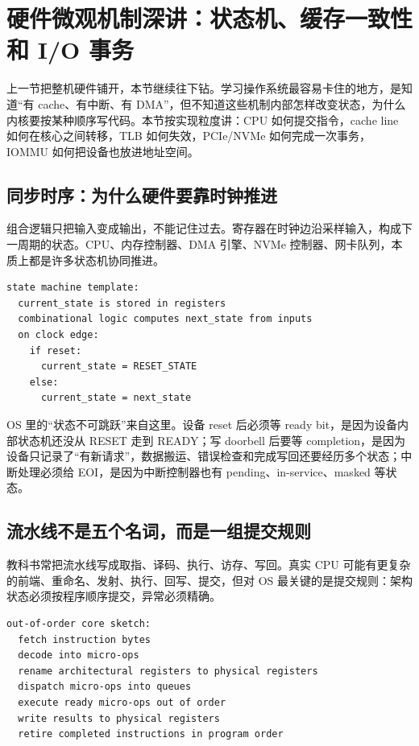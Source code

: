 \section{硬件微观机制深讲：状态机、缓存一致性和 I/O 事务}

上一节把整机硬件铺开，本节继续往下钻。学习操作系统最容易卡住的地方，是知道“有 cache、有中断、有 DMA”，但不知道这些机制内部怎样改变状态，为什么内核要按某种顺序写代码。本节按实现粒度讲：CPU 如何提交指令，cache line 如何在核心之间转移，TLB 如何失效，PCIe/NVMe 如何完成一次事务，IOMMU 如何把设备也放进地址空间。

\subsection{同步时序：为什么硬件要靠时钟推进}

组合逻辑只把输入变成输出，不能记住过去。寄存器在时钟边沿采样输入，构成下一周期的状态。CPU、内存控制器、DMA 引擎、NVMe 控制器、网卡队列，本质上都是许多状态机协同推进。

\begin{lstlisting}
state machine template:
  current_state is stored in registers
  combinational logic computes next_state from inputs
  on clock edge:
    if reset:
      current_state = RESET_STATE
    else:
      current_state = next_state
\end{lstlisting}

OS 里的“状态不可跳跃”来自这里。设备 reset 后必须等 ready bit，是因为设备内部状态机还没从 RESET 走到 READY；写 doorbell 后要等 completion，是因为设备只记录了“有新请求”，数据搬运、错误检查和完成写回还要经历多个状态；中断处理必须给 EOI，是因为中断控制器也有 pending、in-service、masked 等状态。

\subsection{流水线不是五个名词，而是一组提交规则}

教科书常把流水线写成取指、译码、执行、访存、写回。真实 CPU 可能有更复杂的前端、重命名、发射、执行、回写、提交，但对 OS 最关键的是提交规则：架构状态必须按程序顺序提交，异常必须精确。

\begin{lstlisting}
out-of-order core sketch:
  fetch instruction bytes
  decode into micro-ops
  rename architectural registers to physical registers
  dispatch micro-ops into queues
  execute ready micro-ops out of order
  write results to physical registers
  retire completed instructions in program order
\end{lstlisting}

